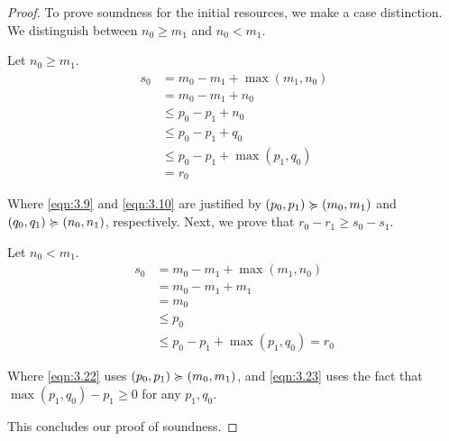 \begin{proof}
   To prove soundness for the initial resources, we make a case distinction. We distinguish between \(n_0 \geq m_1\) and \(n_0 < m_1 \).

   Let \(n_0 \geq m_1\).
   \begin{align}
      s_0   &= m_0 - m_1 + \max(m_1, n_0) \\
            &= m_0 - m_1 + n_0 \\
            &\leq p_0 - p_1 + n_0 \label{eqn:3.9}\\
            &\leq p_0 - p_1 + q_0 \label{eqn:3.10}\\
            &\leq p_0 - p_1 + \max(p_1, q_0) \\
            &= r_0
   \end{align}
   
   Where \cref{eqn:3.9} and \cref{eqn:3.10} are justified by \((p_0, p_1) \succcurlyeq (m_0, m_1)\) and \((q_0, q_1) \succcurlyeq (n_0, n_1)\), respectively. Next, we prove that \(r_0 - r_1 \geq s_0 - s_1\).

   Let \(n_0 < m_1\). 
   \begin{align}
      s_0   &= m_0 - m_1 + \max(m_1, n_0) \\
            &= m_0 - m_1 + m_1 \\
            &= m_0 \\
            &\leq p_0 \label{eqn:3.22}\\
            &\leq p_0 - p_1 + \max(p_1, q_0) = r_0 \label{eqn:3.23}
   \end{align}

   Where \cref{eqn:3.22} uses \((p_0, p_1) \succcurlyeq (m_0, m_1)\), and \cref{eqn:3.23} uses the fact that \(\max(p_1, q_0) - p_1 \geq 0\) for any \(p_1, q_0\).

   This concludes our proof of soundness.
\end{proof}
